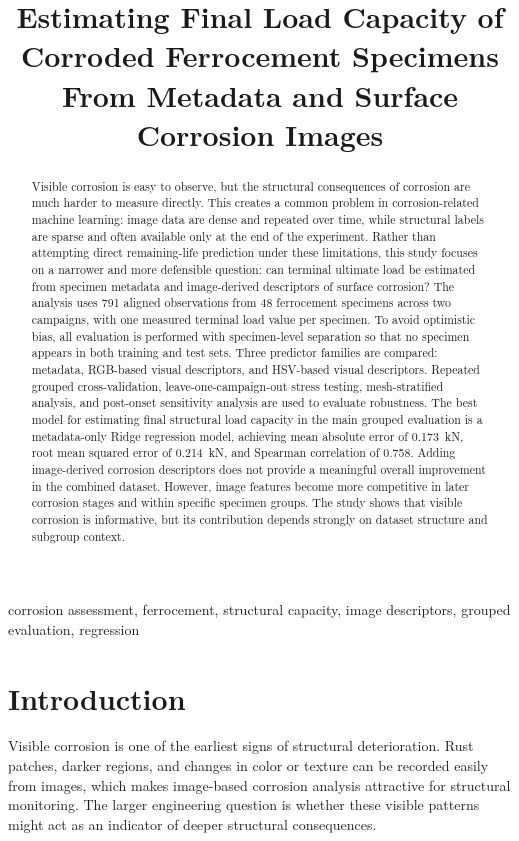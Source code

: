 \documentclass[conference]{IEEEtran}
\title{Estimating Final Load Capacity of Corroded Ferrocement Specimens From Metadata and Surface Corrosion Images}
\author{\IEEEauthorblockN{Parastoo Hashemi Alvar}
\IEEEauthorblockA{\textit{Politecnico di Torino} \\
s339438 \\
s339438@studenti.polito.it}
}
\begin{document}
\maketitle

\begin{abstract}

Visible corrosion is easy to observe, but the structural consequences of corrosion are much harder to measure directly. This creates a common problem in corrosion-related machine learning: image data are dense and repeated over time, while structural labels are sparse and often available only at the end of the experiment. Rather than attempting direct remaining-life prediction under these limitations, this study focuses on a narrower and more defensible question: can terminal ultimate load be estimated from specimen metadata and image-derived descriptors of surface corrosion? The analysis uses 791 aligned observations from 48 ferrocement specimens across two campaigns, with one measured terminal load value per specimen. To avoid optimistic bias, all evaluation is performed with specimen-level separation so that no specimen appears in both training and test sets. Three predictor families are compared: metadata, RGB-based visual descriptors, and HSV-based visual descriptors. Repeated grouped cross-validation, leave-one-campaign-out stress testing, mesh-stratified analysis, and post-onset sensitivity analysis are used to evaluate robustness. The best model for estimating final structural load capacity in the main grouped evaluation is a metadata-only Ridge regression model, achieving mean absolute error of 0.173~kN, root mean squared error of 0.214~kN, and Spearman correlation of 0.758. Adding image-derived corrosion descriptors does not provide a meaningful overall improvement in the combined dataset. However, image features become more competitive in later corrosion stages and within specific specimen groups. The study shows that visible corrosion is informative, but its contribution depends strongly on dataset structure and subgroup context.
\end{abstract}

\begin{IEEEkeywords}
corrosion assessment, ferrocement, structural capacity, image descriptors, grouped evaluation, regression
\end{IEEEkeywords}

\section{Introduction}
Visible corrosion is one of the earliest signs of structural deterioration. Rust patches, darker regions, and changes in color or texture can be recorded easily from images, which makes image-based corrosion analysis attractive for structural monitoring. The larger engineering question is whether these visible patterns might act as an indicator of deeper structural consequences.
\end{document}
